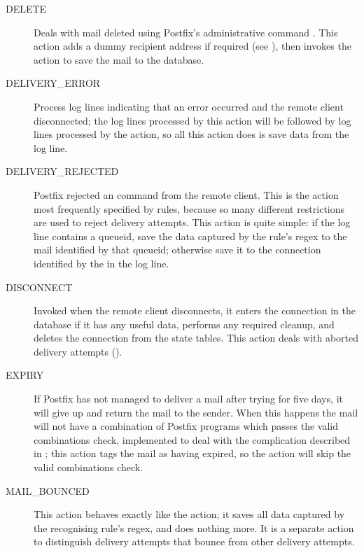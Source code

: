 \begin{description}
    \item [DELETE] Deals with mail deleted using Postfix's administrative
        command .  This action adds a dummy recipient
        address if required (see ), then invokes the  action to save the
        mail to the database.

    \item [DELIVERY\_ERROR] Process log lines indicating that an error
        occurred and the remote client disconnected; the log lines
        processed by this action will be followed by log lines processed by
        the  action, so all this action does is save
        data from the log line.

    \item [DELIVERY\_REJECTED] Postfix rejected an  command
        from the remote client.  This is the action most frequently
        specified by rules, because so many different restrictions are used
        to reject delivery attempts.  This action is quite simple: if the
        log line contains a queueid, save the data captured by the rule's
        regex to the mail identified by that queueid; otherwise save it to
        the connection identified by the  in the log line.

    \item [DISCONNECT] Invoked when the remote client disconnects, it
        enters the connection in the database if it has any useful data,
        performs any required cleanup, and deletes the connection from the
        state tables.  This action deals with aborted delivery attempts
        ().

    \item [EXPIRY] If Postfix has not managed to deliver a mail after
        trying for five days, it will give up and return the mail to the
        sender.  When this happens the mail will not have a combination of
        Postfix programs which passes the valid combinations check,
        implemented to deal with the complication described in
        ; this action tags the mail as
        having expired, so the  action will skip the valid
        combinations check.

    \item [MAIL\_BOUNCED] This action behaves exactly like the
         action; it saves all data captured by the
        recognising rule's regex, and does nothing more.  It is a separate
        action to distinguish delivery attempts that bounce from other
        delivery attempts.


\end{description}
